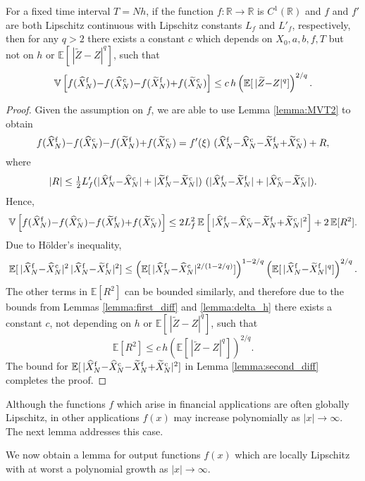 \documentclass[review]{siamart190516}
\def \RR {{\mathbb{R}}}
\def \EE {{\mathbb{E}}}
\def \VV {{\mathbb{V}}}
\def \tZ {{\widetilde{Z}}}
\def \tXf  {{\widetilde{X}^{\rm f}}}
\def \tXc  {{\widetilde{X}^{\rm c}}}
\def \hXf {{\widehat{X}^{\rm f}}}
\def \hXc {{\widehat{X}^{\rm c}}}
\newcommand{\fracs}[2]{{\textstyle \frac{#1}{#2}}}
\begin{document}
\begin{lemma}
For a fixed time interval $T\!=\!N h$, if the function $f: \RR \rightarrow \RR$
is $C^1(\RR)$ and $f$ and $f'$ are both Lipschitz continuous with Lipschitz constants 
$L_f$ and $L'_f$, respectively, then for any $q\!>\!2$ there exists a constant $c$ which 
depends on $X_0, a, b, f, T$ but not on $h$ or $\EE[\, |\tZ{-}Z|^q]$, such that
\[
\VV\left[ f(\hXf_N){-}f(\hXc_N) {-} f(\tXf_N){+}f(\tXc_N)\right] 
\leq c\, h \left(\EE[\, |\tZ{-}Z|^q]\right)^{2/q}.
\]
\end{lemma}
\begin{proof}
Given the assumption on $f$, we are able to use Lemma \ref{lemma:MVT2} to obtain
\[
f(\hXf_N){-}f(\hXc_N) {-} f(\tXf_N){+}f(\tXc_N)
= f'(\xi)\ (\hXf_N{-}\hXc_N{-}\tXf_N{+}\tXc_N)
+ R,
\]
where
\[
|R| \leq \fracs{1}{2} L'_f (|\hXf_N{-}\hXc_N| + |\tXf_N{-}\tXc_N|)\ (|\hXf_N{-}\tXf_N| + |\hXc_N{-}\tXc_N|).
\]
Hence,
\[
\VV\left[ f(\hXf_N){-}f(\hXc_N) {-} f(\tXf_N){+}f(\tXc_N)\right] 
\leq 2 L_f^2\, \EE\left[\, |\hXf_N{-}\hXc_N{-}\tXf_N{+}\tXc_N|^2\right]
 + 2\, \EE[R^2]. 
\]
Due to H\"older's inequality, 
\[
\EE[\, |\hXf_N{-}\hXc_N|^2 \, |\hXf_N{-}\tXf_N|^2]
\leq
\left( \EE[\,|\hXf_N{-}\hXc_N|^{2/(1-2/q)}] \right)^{1 - 2/q}
\left( \EE[\,|\hXf_N{-}\tXf_N|^q] \right)^{2/q}.
\]
The other terms in $\EE[R^2]$ can be bounded similarly, and therefore due to the bounds
from Lemmas \ref{lemma:first_diff} and \ref{lemma:delta_h} there exists a constant $c$,
not depending on $h$ or $\EE[\,|\tZ{-}Z|^q]$, such that
\[
\EE[R^2] \leq c\, h \left(\EE[\,|\tZ{-}Z|^q]\right)^{2/q}.
\]
The bound for $\EE[\, |\hXf_N{-}\hXc_N{-}\tXf_N{+}\tXc_N|^2]$ in Lemma
\ref{lemma:second_diff} completes the proof.
\end{proof}

Although the functions $f$ which arise in financial applications are often 
globally Lipschitz, in other applications $f(x)$ may increase polynomially
as $|x|\rightarrow \infty$.  The next lemma addresses this case.
\fi

We now obtain a lemma for output functions $f(x)$ which are locally
Lipschitz with at worst a polynomial growth as $|x|\rightarrow\infty$.
\end{document}
